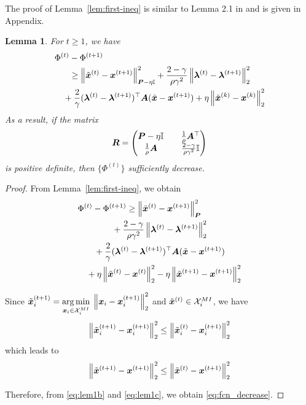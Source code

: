 \documentclass[twocolumn,amsthm]{autart}%
\theoremstyle{definition}
\theoremstyle{plain}
\newtheorem{lemma}{Lemma}
\begin{document}
The proof of Lemma~\ref{lem:first-ineq} is similar to Lemma 2.1 in \cite{deng2017parallel} and is given in Appendix.

\begin{lemma}
\label{lem:suff-decrease}
For $t \ge 1$, we have
\begin{equation}
\label{eq:fcn_decrease}
\begin{multlined}
\Phi^{(t)} - \Phi^{(t+1)}  \\
\ge \norm{\xtil^{(t)}-\bbsym{x}^{(t+1)}}_{\bbsym{P}-\eta \II}^2
+ \frac{2-\gamma}{\rho \gamma^2} \norm{\bbsym{\lambda}^{(t)}-\bbsym{\lambda}^{(t+1)}}_2^2 \\
+ \frac{2}{\gamma} (\bbsym{\lambda}^{(t)}-\bbsym{\lambda}^{(t+1)})^\top \bbsym{A} (\xtil-\bbsym{x}^{(t+1)})
+ \eta \norm{\xtil^{(k)}-\bbsym{x}^{(k)}}_2^2
\end{multlined}
\end{equation}
As a result, if the matrix 
\begin{equation}
\boldsymbol{R} = 
\begin{pmatrix}
\boldsymbol{P} - \eta \mathbb{I} & \quad \frac{1}{\rho} \boldsymbol{A}^\top \\
\frac{1}{\rho} \boldsymbol{A} & \quad \frac{2-\gamma}{\rho \gamma^2} \mathbb{I} \\
\end{pmatrix}
\end{equation}
is positive definite, then $\{\Phi^{(t)}\}$ sufficiently decrease.
\end{lemma}

\begin{proof}
From Lemma~\ref{lem:first-ineq}, we obtain
\begin{equation}
\label{eq:lem1b}
\begin{multlined}
\Phi^{(t)} - \Phi^{(t+1)} 
\ge \norm{\xtil^{(t)}-\bbsym{x}^{(t+1)}}_{\bbsym{P}}^2  \\
+ \frac{2-\gamma}{\rho \gamma^2} \norm{\bbsym{\lambda}^{(t)}-\bbsym{\lambda}^{(t+1)}}_2^2 \\
+ \frac{2}{\gamma} (\bbsym{\lambda}^{(t)}-\bbsym{\lambda}^{(t+1)})^\top \bbsym{A} (\xtil-\bbsym{x}^{(t+1)}) \\
+ \eta \norm{\xtil^{(t)}-\bbsym{x}^{(t)}}_2^2 - \eta \norm{\xtil^{(t+1)}-\bbsym{x}^{(t+1)}}_2^2 
\end{multlined}
\end{equation}

Since $\Tilde{\boldsymbol{x}}_i^{(t+1)} = \underset{\boldsymbol{x}_i \in \mathcal{X}_i^{\relax{MI}}}{\operatorname*{arg\,min}} \;\left\lVert \boldsymbol{x}_i - \boldsymbol{x}_i^{(t+1)} \right\rVert_2^2$ and $\Tilde{\boldsymbol{x}}^{(t)} \in \mathcal{X}_i^{\relax{MI}}$, we have
\begin{equation}
\left\lVert \Tilde{\boldsymbol{x}}_i^{(t+1)} - \boldsymbol{x}_i^{(t+1)} \right\rVert_2^2 
\le \left\lVert \Tilde{\boldsymbol{x}}_i^{(t)} - \boldsymbol{x}_i^{(t+1)} \right\rVert_2^2 
\end{equation}
which leads to
\begin{equation}
\label{eq:lem1c}
\left\lVert \Tilde{\boldsymbol{x}}^{(t+1)} - \boldsymbol{x}^{(t+1)} \right\rVert_2^2 
\le \left\lVert \Tilde{\boldsymbol{x}}^{(t)} - \boldsymbol{x}^{(t+1)} \right\rVert_2^2 
\end{equation}

Therefore, from \eqref{eq:lem1b} and \eqref{eq:lem1c}, we obtain \eqref{eq:fcn_decrease}.
\end{proof}
\end{document}
